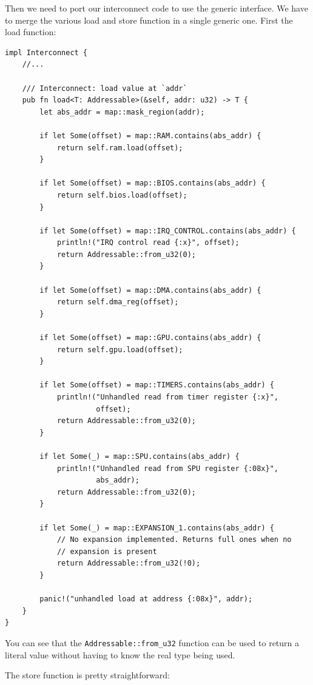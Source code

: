 \documentclass[a4paper]{article}
\newcommand{\code}[1] {\texttt{#1}}
\begin{document}
Then we need to port our interconnect code to use the generic
interface. We have to merge the various load and store function in a
single generic one. First the load function:

\begin{lstlisting}
impl Interconnect {
    //...

    /// Interconnect: load value at `addr`
    pub fn load<T: Addressable>(&self, addr: u32) -> T {
        let abs_addr = map::mask_region(addr);

        if let Some(offset) = map::RAM.contains(abs_addr) {
            return self.ram.load(offset);
        }

        if let Some(offset) = map::BIOS.contains(abs_addr) {
            return self.bios.load(offset);
        }

        if let Some(offset) = map::IRQ_CONTROL.contains(abs_addr) {
            println!("IRQ control read {:x}", offset);
            return Addressable::from_u32(0);
        }

        if let Some(offset) = map::DMA.contains(abs_addr) {
            return self.dma_reg(offset);
        }

        if let Some(offset) = map::GPU.contains(abs_addr) {
            return self.gpu.load(offset);
        }

        if let Some(offset) = map::TIMERS.contains(abs_addr) {
            println!("Unhandled read from timer register {:x}",
                     offset);
            return Addressable::from_u32(0);
        }

        if let Some(_) = map::SPU.contains(abs_addr) {
            println!("Unhandled read from SPU register {:08x}",
                     abs_addr);
            return Addressable::from_u32(0);
        }

        if let Some(_) = map::EXPANSION_1.contains(abs_addr) {
            // No expansion implemented. Returns full ones when no
            // expansion is present
            return Addressable::from_u32(!0);
        }

        panic!("unhandled load at address {:08x}", addr);
    }
}
\end{lstlisting}

You can see that the \code{Addressable::from\_u32} function can be
used to return a literal value without having to know the real type
being used.

The store function is pretty straightforward:
\end{document}

